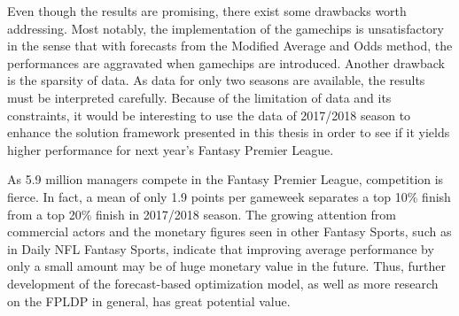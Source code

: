 \newpar

Even though the results are promising, there exist some drawbacks worth addressing. Most notably, the implementation of the gamechips is unsatisfactory in the sense that with forecasts from the Modified Average and Odds method, the performances are aggravated when gamechips are introduced. Another drawback is the sparsity of data. As data for only two seasons are available, the results must be interpreted carefully. Because of the limitation of data and its constraints, it would be interesting to use the data of 2017/2018 season to enhance the solution framework presented in this thesis in order to see if it yields higher performance for next year's Fantasy Premier League.

\newpar

As 5.9 million managers compete in the Fantasy Premier League, competition is fierce. In fact, a mean of only 1.9 points per gameweek separates a top 10\% finish from a top 20\% finish in 2017/2018 season. The growing attention from commercial actors and the monetary figures seen in other Fantasy Sports, such as in Daily NFL Fantasy Sports, indicate that improving average performance by only a small amount may be of huge monetary value in the future. Thus, further development of the forecast-based optimization model, as well as more research on the FPLDP in general,  has great potential value.


